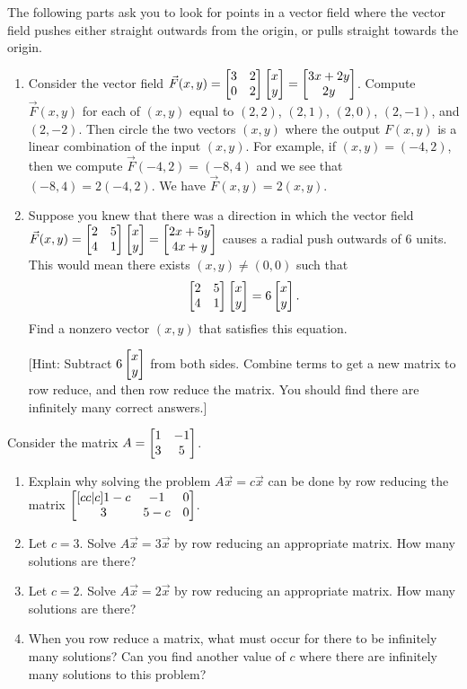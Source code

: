 \mysubsection{\ideaeig}
\begin{problem}
The following parts ask you to look for points in a vector field where the vector field pushes either straight outwards from the origin, or pulls straight towards the origin.
\begin{enumerate}
\item
Consider the vector field $\vec F(x,y) = \begin{bmatrix} 3&2\\0&2 \end{bmatrix}\begin{bmatrix} x\\y \end{bmatrix} = \begin{bmatrix} 3x+2y\\2y \end{bmatrix}$. 
Compute $\vec F(x,y)$ for each of $(x,y)$ equal to $(2,2)$, $(2,1)$, $(2,0)$, $(2,-1)$, and $(2,-2)$.  Then circle the two vectors $(x,y)$ where the output $F(x,y)$ is a linear combination of the input $(x,y)$. 
For example, if $(x,y)=(-4,2)$, then we compute $\vec F(-4,2) = (-8, 4)$ and we see that $(-8,4) = 2(-4,2)$.  We have $\vec F(x,y) = 2(x,y)$.
 \item Suppose you knew that there was a direction in which the vector field 
$\vec F(x,y) = \begin{bmatrix} 2&5\\4&1 \end{bmatrix}\begin{bmatrix} x\\y \end{bmatrix} = \begin{bmatrix} 2x+5y\\4x+y \end{bmatrix}$ causes a radial push outwards of 6 units. This would mean there exists $(x,y)\neq(0,0)$ such that 
$$\begin{bmatrix} 2&5\\4&1 \end{bmatrix}\begin{bmatrix} x\\y \end{bmatrix} = 6\begin{bmatrix} x\\y \end{bmatrix}.$$
Find a nonzero vector $(x,y)$ that satisfies this equation.

[Hint: Subtract $6\begin{bmatrix} x\\y \end{bmatrix}$ from both sides. Combine terms to get a new matrix to row reduce, and then row reduce the matrix. You should find there are infinitely many correct answers.] 

\end{enumerate}
\end{problem}


\begin{problem}
 Consider the matrix $A=\begin{bmatrix} 1&-1\\3&5 \end{bmatrix}$.
\begin{enumerate}
 \item Explain why solving the problem $A\vec x = c\vec x$ can be done by row reducing the matrix $\begin{bmatrix} [cc|c]1-c&-1&0\\3&5-c&0 \end{bmatrix}$.
 \item Let $c=3$. Solve $A\vec x = 3\vec x$ by row reducing an appropriate matrix. How many solutions are there?
 \item Let $c=2$. Solve $A\vec x = 2\vec x$ by row reducing an appropriate matrix. How many solutions are there?
 \item  When you row reduce a matrix, what must occur for there to be infinitely many solutions?   
  Can you find another value of $c$ where there are infinitely many solutions to this problem?
\end{enumerate}

\end{problem}




